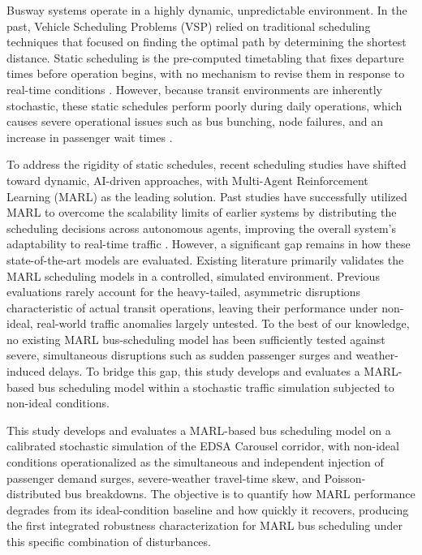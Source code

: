Busway systems operate in a highly dynamic, unpredictable environment. In the past, Vehicle Scheduling Problems (VSP) relied on traditional scheduling techniques that focused on finding the optimal path by determining the shortest distance. Static scheduling is the pre-computed timetabling that fixes departure times before operation begins, with no mechanism to revise them in response to real-time conditions \cite{Ju2023Joint,Cao2022Train,Nie2025CMRM}. However, because transit environments are inherently stochastic, these static schedules perform poorly during daily operations, which causes severe operational issues such as bus bunching, node failures, and an increase in passenger wait times \cite{Daganzo2009,FEMbusbunching}.

To address the rigidity of static schedules, recent scheduling studies have shifted toward dynamic, AI-driven approaches, with Multi-Agent Reinforcement Learning (MARL) as the leading solution. Past studies have successfully utilized MARL to overcome the scalability limits of earlier systems by distributing the scheduling decisions across autonomous agents, improving the overall system's adaptability to real-time traffic \cite{Rodriguez2023Cooperative,Wang2023MultiObj,Wangsun}. However, a significant gap remains in how these state-of-the-art models are evaluated. Existing literature primarily validates the MARL scheduling models in a controlled, simulated environment. Previous evaluations rarely account for the heavy-tailed, asymmetric disruptions characteristic of actual transit operations, leaving their performance under non-ideal, real-world traffic anomalies largely untested. To the best of our knowledge, no existing MARL bus-scheduling model has been sufficiently tested against severe, simultaneous disruptions such as sudden passenger surges and weather-induced delays. To bridge this gap, this study develops and evaluates a MARL-based bus scheduling model within a stochastic traffic simulation subjected to non-ideal conditions.

This study develops and evaluates a MARL-based bus scheduling model on a calibrated stochastic simulation of the EDSA Carousel corridor, with non-ideal conditions operationalized as the simultaneous and independent injection of passenger demand surges, severe-weather travel-time skew, and Poisson-distributed bus breakdowns. The objective is to quantify how MARL performance degrades from its ideal-condition baseline and how quickly it recovers, producing the first integrated robustness characterization for MARL bus scheduling under this specific combination of disturbances.


